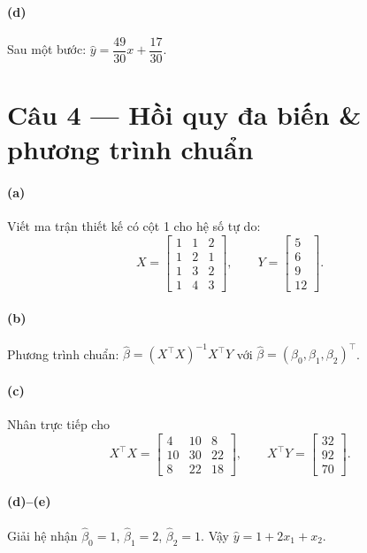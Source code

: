\paragraph{(d)} Sau một bước: $\hat y=\dfrac{49}{30}x+\dfrac{17}{30}$.

\section*{Câu 4 --- Hồi quy đa biến \& phương trình chuẩn}

\paragraph{(a)} Viết ma trận thiết kế có cột 1 cho hệ số tự do:
\[
X=\begin{bmatrix}
1&1&2\\1&2&1\\1&3&2\\1&4&3
\end{bmatrix},\qquad
Y=\begin{bmatrix}5\\6\\9\\12\end{bmatrix}.
\]

\paragraph{(b)} Phương trình chuẩn: $\hat\beta=(X^\top X)^{-1}X^\top Y$ với $\hat\beta=(\beta_0,\beta_1,\beta_2)^\top$.

\paragraph{(c)} Nhân trực tiếp cho
\[
X^\top X=\begin{bmatrix}4&10&8\\10&30&22\\8&22&18\end{bmatrix},\qquad
X^\top Y=\begin{bmatrix}32\\92\\70\end{bmatrix}.
\]

\paragraph{(d)--(e)} Giải hệ nhận $\hat\beta_0=1$, $\hat\beta_1=2$, $\hat\beta_2=1$.
Vậy $\hat y=1+2x_1+x_2$.

